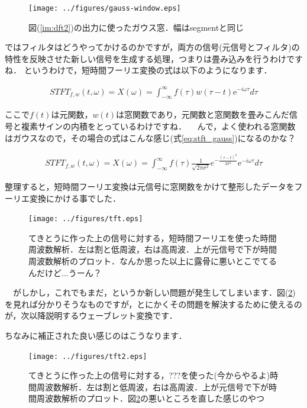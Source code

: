 \documentclass[11pt,a4paper]{ujreport} 	%
\begin{document}
\begin{figure}[H]
  \label{im:gauss-window}
  \centering
  \texttt{[image: ../figures/gauss-window.eps]}
  \caption{図(\ref{im:dft2})の出力に使ったガウス窓．幅はsegmentと同じ}
\end{figure}

ではフィルタはどうやってかけるのかですが，両方の信号(元信号とフィルタ)の特性を反映させた新しい信号を生成する処理，つまりは畳み込みを行うわけですね．
というわけで，短時間フーリエ変換の式は以下のようになります．

\begin{eqnarray}
STFT_{f,w}(t, \omega) =X(\omega)= \int_{-\infty}^{\infty} f(\tau)w(\tau - t)\mathrm{e}^{-i\omega \tau} d\tau
\label{eq:stft}
\end{eqnarray}

ここで$f(t)$は元関数，$w(t)$は窓関数であり，元関数と窓関数を畳みこんだ信号と複素サインの内積をとっているわけですね．
　んで，よく使われる窓関数はガウスなので，その場合の式はこんな感じ(式\ref{eq:stft_gauss})になるのかな？

\begin{eqnarray}
STFT_{f,w}(t, \omega) = X(\omega) = \int_{-\infty}^{\infty} f(\tau) \frac{1}{\sqrt{2\pi\sigma^2}}e^{-\frac{{(\tau-t)}^2}{2\sigma^2}}\mathrm{e}^{-i\omega \tau} d\tau
\label{eq:stft_gauss}
\end{eqnarray}

整理すると，短時間フーリエ変換は元信号に窓関数をかけて整形したデータをフーリエ変換にかける事でした．\\

\begin{figure}[H]
  \label{im:tft}
  \centering
  \texttt{[image: ../figures/tft.eps]}
  \caption{てきとうに作った上の信号に対する，短時間フーリエを使った時間周波数解析．左は割と低周波，右は高周波．上が元信号で下が時間周波数解析のプロット．なんか思った以上に露骨に悪いとこでてるんだけど...うーん？}
\end{figure}

　がしかし，これでもまだ，というか新しい問題が発生してしまいます．図(\ref{im:tft})を見れば分かりそうなものですが，とにかくその問題を解決するために使えるのが，次以降説明するウェーブレット変換です．

ちなみに補正された良い感じのはこうなります．

\begin{figure}[H]
  \label{im:tft2}
  \centering
  \texttt{[image: ../figures/tft2.eps]}
  \caption{てきとうに作った上の信号に対する，???を使った(今からやるよ)時間周波数解析．左は割と低周波，右は高周波．上が元信号で下が時間周波数解析のプロット．図\ref{im:tft}の悪いところを直した感じのやつ}
\end{figure}
\end{document}
